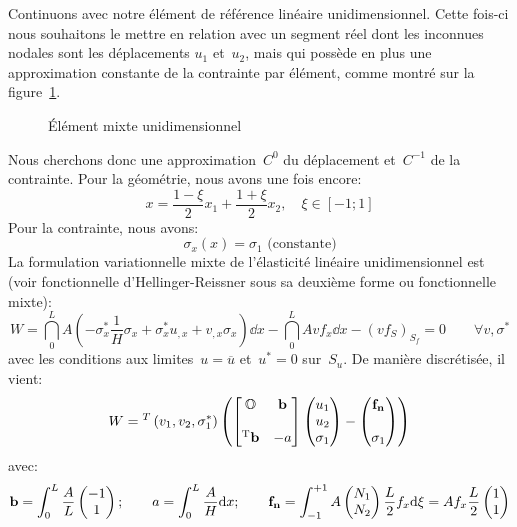 Continuons avec notre élément de référence linéaire unidimensionnel. Cette fois-ci nous souhaitons le mettre en relation avec un segment réel dont les inconnues nodales sont les déplacements $u_1$ et~$u_2$, mais qui possède en plus une approximation constante de la contrainte par élément, comme montré sur la figure~\ref{fig-ex2mixte}.
\begin{figure}[ht]\centering
{} \hspace{5 em}
\caption{Élément mixte unidimensionnel}\label{fig-ex2mixte}
\end{figure}
\medskipvm
Nous cherchons donc une approximation~$C^0$ du déplacement et~$C^{-1}$ de la
contrainte.
\medskipvm
Pour la géométrie, nous avons une fois encore:
\begin{equation} x=\frac{1-\xi}2 x_1 + \frac{1+\xi}2 x_2, \quad \xi\in[-1;1] \end{equation}
\medskipvm
Pour la contrainte, nous avons:
\begin{equation} \sigma_x(x)=\sigma_1 \text{ (constante)} \end{equation}
\medskipvm
La formulation variationnelle mixte de l'élasticité linéaire unidimensionnel est (voir fonctionnelle
d'Hellinger-Reissner sous sa deuxième forme ou fonctionnelle mixte):
\begin{equation}
W=\dint_0^L A\left(-\sigma_x^*\frac1H\sigma_x+\sigma_x^*u_{,x}+v_{,x}\sigma_x\right) \dd x
-\dint_0^L Avf_x \dd x - (v f_S)_{S_f} = 0\qquad \forall v,\sigma^*
\end{equation}
avec les conditions aux limites~$u=\overline{u}$ et~$u^*=0$ sur~$S_u$.
\medskipvm
De manière discrétisée, il vient:
\begin{equation}
W = \LLL{v_1, v_2, \sigma_1^*}\left(
\MM*{\mO & \VV{b}\\ ~\\ \LL{b} & -a}
\VV*{u_1\\u_2\\ \sigma_1}
- \VV*{\VV{f_n}\\~\\ \sigma_1}
\right)\end{equation}
avec:
\begin{equation}
\VV{b}=\dint_0^L \frac{A}L \VV*{-1\\1}; \qquad
a=\dint_0^L \frac{A}H \dd x; \qquad
\VV{f_n} = \dint_{-1}^{+1} A \VV*{N_1\\N_2} \frac{L}2 f_x \dd\xi =
 A f_x \frac{L}2 \VV*{1\\1}
\end{equation}
